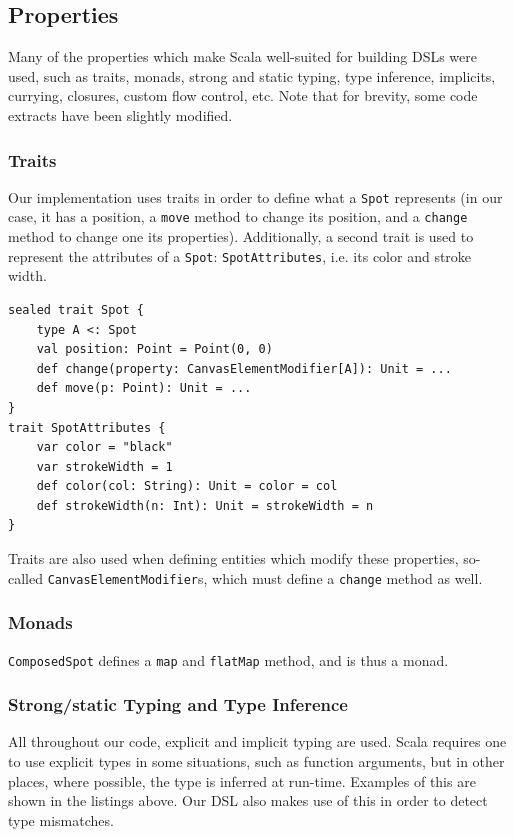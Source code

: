 \documentclass[journal,onecolumn, 9pt]{IEEEtran}
\theoremstyle{definition}
\newcommand{\scala}[1]{\texttt{#1}}
\begin{document}
\subsection{Properties}
Many of the properties which make Scala well-suited for building DSLs were used, such as traits, monads, strong and static typing, type inference, implicits, currying, closures, custom flow control, etc.
Note that for brevity, some code extracts have been slightly modified.

\subsubsection{Traits}
Our implementation uses traits in order to define what a \scala{Spot} represents (in our case, it has a position, a \scala{move} method to change its position, and a \scala{change} method to change one its properties).
Additionally, a second trait is used to represent the attributes of a \scala{Spot}: \scala{SpotAttributes}, i.e. its color and stroke width.
\begin{verbatim}
sealed trait Spot {
	type A <: Spot
	val position: Point = Point(0, 0)
	def change(property: CanvasElementModifier[A]): Unit = ...
	def move(p: Point): Unit = ...
}
trait SpotAttributes {
	var color = "black"
	var strokeWidth = 1
	def color(col: String): Unit = color = col
	def strokeWidth(n: Int): Unit = strokeWidth = n
}
\end{verbatim}

Traits are also used when defining entities which modify these properties, so-called \scala{CanvasElementModifier}s, which must define a \scala{change} method as well.

\subsubsection{Monads}
\scala{ComposedSpot} defines a \scala{map} and \scala{flatMap} method, and is thus a monad.

\subsubsection{Strong/static Typing and Type Inference}
All throughout our code, explicit and implicit typing are used.
Scala requires one to use explicit types in some situations, such as function arguments, but in other places, where possible, the type is inferred at run-time.
Examples of this are shown in the listings above.
Our DSL also makes use of this in order to detect type mismatches.
\end{document}
